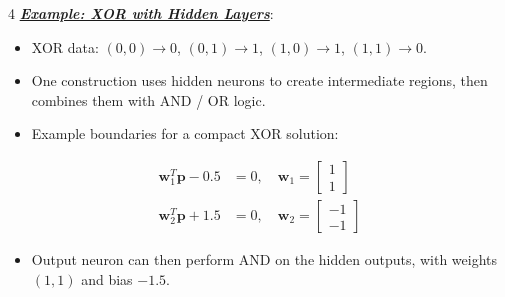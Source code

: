 \documentclass[12pt]{article}
\newcommand{\bulletPoint}[1]{\ul{\textit{\textbf{#1}}}}
\begin{document}
\begin{multicols*}{4}
\bulletPoint{Example: XOR with Hidden Layers}:
\begin{itemize}
\item XOR data: $(0,0)\to 0$, $(0,1)\to 1$, $(1,0)\to 1$, $(1,1)\to 0$.
\item One construction uses hidden neurons to create intermediate regions, then combines them with AND / OR logic.
\item Example boundaries for a compact XOR solution:
\end{itemize}
\useshortskip
\begin{equation*}
    \begin{split}
        \mathbf{w}_1^T\mathbf{p}-0.5&=0,\quad \mathbf{w}_1=\begin{bmatrix}1\\1\end{bmatrix}\\
        \mathbf{w}_2^T\mathbf{p}+1.5&=0,\quad \mathbf{w}_2=\begin{bmatrix}-1\\-1\end{bmatrix}
    \end{split}
\end{equation*}
\begin{itemize}
\item Output neuron can then perform AND on the hidden outputs, with weights $(1,1)$ and bias $-1.5$.
\end{itemize}


\end{multicols*}
\end{document}
